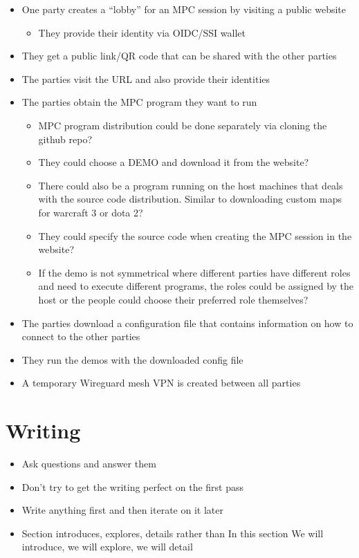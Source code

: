 \begin{itemize}
\tightlist
\item
  One party creates a ``lobby'' for an MPC session by visiting a public
  website

  \begin{itemize}
  \tightlist
  \item
    They provide their identity via OIDC/SSI wallet
  \end{itemize}
\item
  They get a public link/QR code that can be shared with the other
  parties
\item
  The parties visit the URL and also provide their identities
\item
  The parties obtain the MPC program they want to run

  \begin{itemize}
  \tightlist
  \item
    MPC program distribution could be done separately via cloning the
    github repo?
  \item
    They could choose a DEMO and download it from the website?
  \item
    There could also be a program running on the host machines that
    deals with the source code distribution. Similar to downloading
    custom maps for warcraft 3 or dota 2?
  \item
    They could specify the source code when creating the MPC session in
    the website?
  \item
    If the demo is not symmetrical where different parties have
    different roles and need to execute different programs, the roles
    could be assigned by the host or the people could choose their
    preferred role themselves?
  \end{itemize}
\item
  The parties download a configuration file that contains information on
  how to connect to the other parties
\item
  They run the demos with the downloaded config file
\item
  A temporary Wireguard mesh VPN is created between all parties
\end{itemize}

\hypertarget{writing}{%
\chapter{Writing}\label{writing}}

\begin{itemize}
\item
  Ask questions and answer them
\item
  Don't try to get the writing perfect on the first pass
\item
  Write anything first and then iterate on it later
\item
  Section introduces, explores, details rather than In this section We
  will introduce, we will explore, we will detail
\end{itemize}

